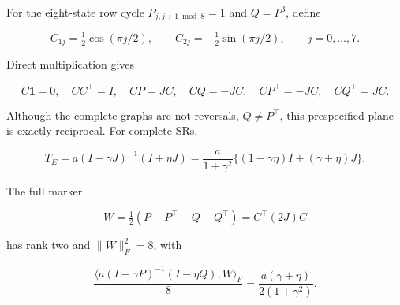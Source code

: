 \documentclass[11pt,a4paper]{article}
\begin{document}
\par
\noindent\begin{minipage}{\linewidth}

For the eight-state row cycle \(P_{j,j+1\bmod8}=1\) and \(Q=P^3\),
define

\[
C_{1j}=\tfrac12\cos(\pi j/2),\qquad
C_{2j}=-\tfrac12\sin(\pi j/2),\qquad j=0,\ldots,7.
\]

\end{minipage}\par

\par
\noindent\begin{minipage}{\linewidth}

Direct multiplication gives

\[
C\mathbf1=0,\quad CC^\top=I,\quad
CP=JC,\quad CQ=-JC,\quad
CP^\top=-JC,\quad CQ^\top=JC.
\]

\end{minipage}\par

\par
\noindent\begin{minipage}{\linewidth}

Although the complete graphs are not reversals, \(Q\ne P^\top\), this
prespecified plane is exactly reciprocal. For complete SRs,

\[
T_E=a(I-\gamma J)^{-1}(I+\eta J)
=\frac{a}{1+\gamma^2}
\{(1-\gamma\eta)I+(\gamma+\eta)J\}.
\]

\end{minipage}\par

\par
\noindent\begin{minipage}{\linewidth}

The full marker

\[
W=\tfrac12(P-P^\top-Q+Q^\top)=C^\top(2J)C
\]

\end{minipage}\par

\par
\noindent\begin{minipage}{\linewidth}

has rank two and \(\|W\|_F^2=8\), with

\[
\frac{\langle a(I-\gamma P)^{-1}(I-\eta Q),W\rangle_F}{8}
=\frac{a(\gamma+\eta)}{2(1+\gamma^2)}.
\]

\end{minipage}\par
\end{document}
